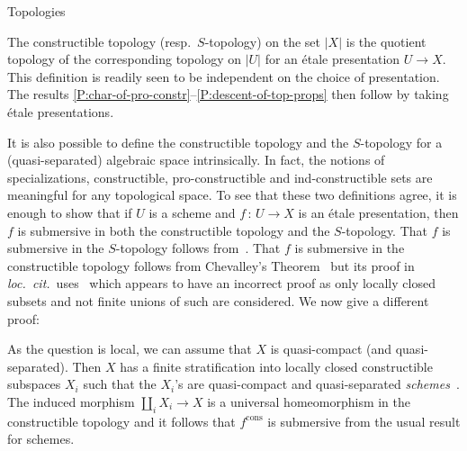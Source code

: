 \documentclass[a4paper,twoside,11pt]{amsart}[2009/07/02] %
\newcommand{\map}[3]{#1\,:\, #2\rightarrow #3}
\newcommand{\etale}{\'{e}tale}
\newcommand{\cons}{\mathrm{cons}} %
\newcommand\loccit{\textit{loc.\ cit.}}
\begin{document}
\begin{section}{Topologies}
\begin{remark}
The constructible topology (resp.\ $S$-topology) on the set $|X|$ is
the quotient topology of the corresponding topology
%
on $|U|$ for an \etale{} presentation $U\to X$. This definition is readily
seen to be independent on the choice of presentation. %
%
The results \ref{P:char-of-pro-constr}--\ref{P:descent-of-top-props} then
follow by taking \etale{} presentations.

It is also possible to define the constructible topology and the $S$-topology
for a (quasi-separated) algebraic space intrinsically. In fact, the notions of
specializations, constructible, pro-constructible and ind-constructible sets
are meaningful for any topological space. To see that these two definitions
agree, it is enough to show that if $U$ is a scheme and $\map{f}{U}{X}$ is an
\etale{} presentation, then $f$ is submersive in both the constructible
topology and the $S$-topology. That $f$ is submersive in the $S$-topology
follows from~\cite[Cor.~5.7.1]{laumon}. That $f$ is submersive in the
constructible topology follows from Chevalley's
Theorem~\cite[Thm.~5.9.4]{laumon}
%
%
but its proof in \loccit{}\ uses~\cite[Cor.~5.9.2]{laumon} which appears
to have an incorrect proof as only locally closed subsets and not finite unions
of such are considered. We now give a different proof:%


As the question is local, we can assume that $X$ is quasi-compact (and
quasi-separated).
%
Then $X$ has a finite stratification into locally closed constructible
subspaces $X_i$ such that the $X_i$'s are quasi-compact and quasi-separated
\emph{schemes}~\cite[Prop.~5.7.6]{raynaud-gruson}. The induced morphism
$\coprod_i X_i\to X$ is a universal homeomorphism in the constructible
topology and it follows that $f^{\cons}$ is submersive from the usual result
for schemes.
\end{remark}

\end{section}

\end{document}
